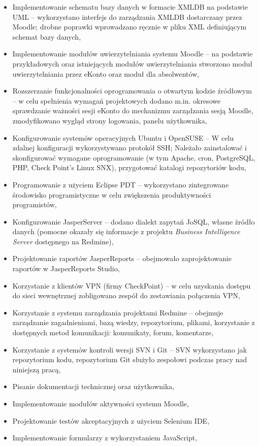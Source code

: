 \begin{itemize}
\item Implementowanie schematu bazy danych w formacie XMLDB na podstawie UML -- wykorzystano interfejs do zarządzania XMLDB dostarczany przez Moodle; drobne poprawki wprowadzano ręcznie w pliku XML definiującym schemat bazy danych,
\item Implementowanie modułów uwierzytelniania systemu Moodle -- na podstawie przykładowych oraz istniejących modułów uwierzytelniania stworzono moduł uwierzytelniania przez eKonto oraz moduł dla absolwentów,
\item Rozszerzanie funkcjonalności oprogramowania o otwartym kodzie źródłowym -- w celu spełnienia wymagań projektowych dodano m.in. okresowe sprawdzanie ważności sesji eKonto do mechanizmu zarządzania sesją Moodle, zmodyfikowano wygląd strony logowania, panelu użytkownika,
\item Konfigurowanie systemów operacyjnych Ubuntu i OpenSUSE -- W celu zdalnej konfiguracji wykorzystywano protokół SSH; Należało zainstalować i skonfigurować wymagane oprogramowanie (w tym Apache, cron, PostgreSQL, PHP, Check Point's Linux SNX), przygotować katalogi repozytoriów kodu,
\item Programowanie z użyciem Eclipse PDT -- wykorzystano zintegrowane środowisko programistyczne w celu zwiększenia produktywności programistów,
\item Konfigurowanie JasperServer -- dodano dialekt zapytań JoSQL, własne źródło danych (pomocne okazały się informacje z projektu \emph{Business Intelligence Server} dostępnego na Redmine),
\item Projektowanie raportów JasperReports -- obejmowało zaprojektowanie raportów w JasperReports Studio,
\item Korzystanie z klientów VPN (firmy CheckPoint) -- w celu uzyskania dostępu do sieci wewnętrznej zobligowano zespół do zestawiania połączenia VPN,
\item Korzystanie z systemu zarządzania projektami Redmine -- obejmuje zarządzanie zagadnieniami, bazą wiedzy, repozytorium, plikami, korzystanie z dostępnych metod komunikacji: komunikaty, forum, komentarze,
\item Korzystanie z systemów kontroli wersji SVN i Git -- SVN wykorzystano jak repozytorium kodu, repozytorium Git służyło zespołowi podczas pracy nad niniejszą pracą,
\item Pisanie dokumentacji technicznej oraz użytkownika,
\item Implementowanie modułów aktywności systemu Moodle,
\item Projektowanie testów akceptacyjnych z użyciem Selenium IDE,
\item Implementowanie formularzy z wykorzystaniem JavaScript,
\end{itemize}

